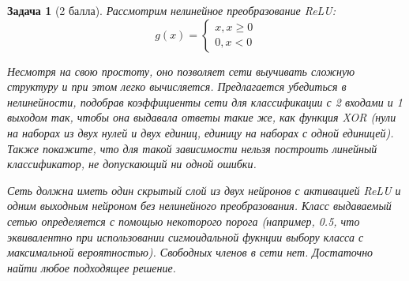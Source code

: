 \documentclass[12pt,fleqn]{article}
\newtheorem{esProblem}{Задача}
\begin{document}
    \begin{esProblem}[2 балла]
        Рассмотрим нелинейное преобразование ReLU: 
        $$g(x) = \begin{cases} x, x \ge 0 \\ 0, x < 0 \end{cases}$$

        Несмотря на свою простоту, оно позволяет сети выучивать сложную структуру и при этом легко вычисляется. Предлагается убедиться в нелинейности, подобрав коэффициенты сети для классификации с 2 входами и 1 выходом так, чтобы она выдавала ответы такие же, как функция XOR (нули на наборах из двух нулей и двух единиц, единицу на наборах с одной единицей). Также покажите, что для такой зависимости нельзя построить линейный классификатор, не допускающий ни одной ошибки.

        Сеть должна иметь один скрытый слой из двух нейронов с активацией ReLU и одним выходным нейроном без нелинейного преобразования. Класс выдаваемый сетью определяется с помощью некоторого порога (например, 0.5, что эквивалентно при использовании сигмоидальной фукнции выбору класса с максимальной вероятностью). Свободных членов в сети нет. Достаточно найти любое подходящее решение.
    \end{esProblem}
\end{document}
